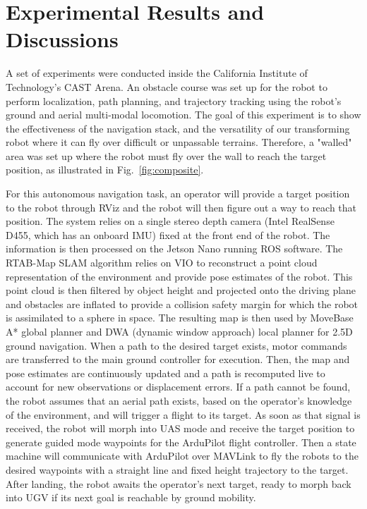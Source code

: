 \documentclass[letterpaper, 10 pt, conference]{ieeeconf}  %
\newcommand{\milad}[1]{{\color{red}#1}}
\newcommand{\filip}[1]{{\color{green}#1}}
\begin{document}
\section{Experimental Results and Discussions}




A set of experiments were conducted inside the California Institute of Technology's CAST Arena. An obstacle course was set up for the robot to perform localization, path planning, and trajectory tracking using the robot's ground and aerial multi-modal locomotion. The goal of this experiment is to show the effectiveness of the navigation stack, and the versatility of our transforming robot where it can fly over difficult or unpassable terrains. Therefore, a "walled" area was set up where the robot must fly over the wall to reach the target position, as illustrated in Fig.~\ref{fig:composite}. 

For this autonomous navigation task, an operator will provide a target position to the robot through RViz and the robot will then figure out a way to reach that position. The system relies on a single stereo depth camera (Intel RealSense D455, which has an onboard IMU) fixed at the front end of the robot. The information is then processed on the Jetson Nano running ROS software. The RTAB-Map SLAM algorithm relies on VIO to reconstruct a point cloud representation of the environment and provide pose estimates of the robot. This point cloud is then filtered by object height and projected onto the driving plane and obstacles are inflated to provide a collision safety margin for which the robot is assimilated to a sphere in space. The resulting map is then used by MoveBase A* global planner and DWA (dynamic window approach) local planner for 2.5D ground navigation. When a path to the desired target exists, motor commands are transferred to the main ground controller for execution. Then, the map and pose estimates are continuously updated and a path is recomputed live to account for new observations or displacement errors. If a path cannot be found, the robot assumes that an aerial path exists, based on the operator's knowledge of the environment, and will trigger a flight to its target. As soon as that signal is received, the robot will morph into UAS mode and receive the target position to generate guided mode waypoints for the ArduPilot flight controller. Then a state machine will communicate with ArduPilot over MAVLink to fly the robots to the desired waypoints with a straight line and fixed height trajectory to the target. After landing, the robot awaits the operator's next target, ready to morph back into UGV if its next goal is reachable by ground mobility. 
\end{document}

